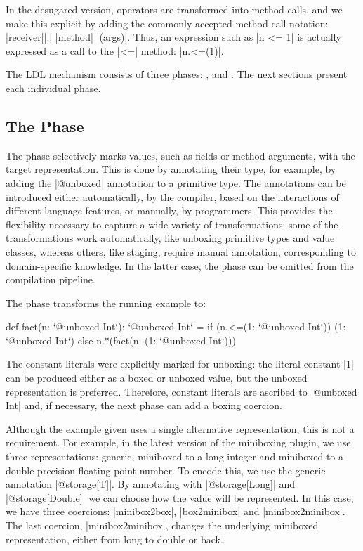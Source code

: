 In the desugared version, operators are transformed into method calls, and we make this explicit by adding the commonly accepted method call notation: |receiver||.| |method| |(args)|. Thus, an expression such as |n <= 1| is actually expressed as a call to the |<=| method: |n.<=(1)|.

The LDL mechanism consists of three phases: \inject{}, \coerce{} and \commit{}. The next sections present each individual phase.

\subsection{The \Inject{} Phase}
\label{ldl:sec:transform:inject}

The \inject{} phase selectively marks values, such as fields or method arguments, with the target representation. This is done by annotating their type, for example, by adding the |@unboxed| annotation to a primitive type. The annotations can be introduced either automatically, by the compiler, based on the interactions of different language features, or manually, by programmers. This provides the flexibility necessary to capture a wide variety of transformations: some of the transformations work automatically, like unboxing primitive types and value classes, whereas others, like staging, require manual annotation, corresponding to domain-specific knowledge. In the latter case, the \inject{} phase can be omitted from the compilation pipeline.

The \inject{} phase transforms the running example to:

\begin{lstlisting-nobreak}
 def fact(n: `@unboxed Int`): `@unboxed Int` =
   if (n.<=(1: `@unboxed Int`))
     (1: `@unboxed Int`)
   else
     n.*(fact(n.-(1: `@unboxed Int`)))
\end{lstlisting-nobreak}

The constant literals were explicitly marked for unboxing: the literal constant |1| can be produced either as a boxed or unboxed value, but the unboxed representation is preferred. Therefore, constant literals are ascribed to |@unboxed Int| and, if necessary, the next phase can add a boxing coercion.

Although the example given uses a single alternative representation, this is not a requirement. For example, in the latest version of the miniboxing plugin, we use three representations: generic, miniboxed to a long integer and miniboxed to a double-precision floating point number. To encode this, we use the generic annotation |@storage[T]|. By annotating with |@storage[Long]| and |@storage[Double]| we can choose how the value will be represented. In this case, we have three coercions: |minibox2box|, |box2minibox| and |minibox2minibox|. The last coercion, |minibox2minibox|, changes the underlying miniboxed representation, either from long to double or back.

